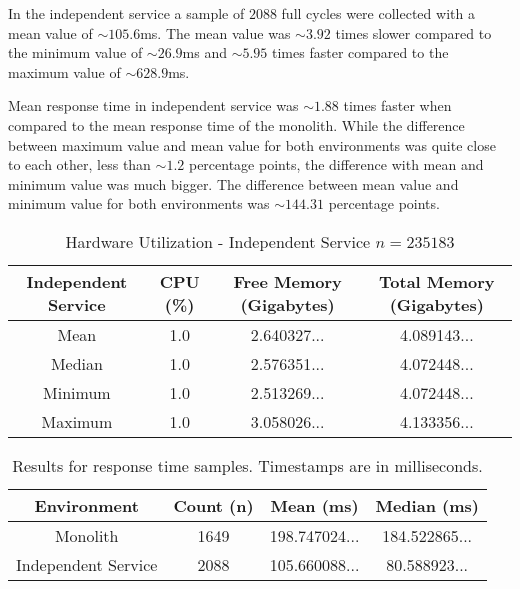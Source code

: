 In the independent service a sample of $2088$ full cycles were collected with a mean value of $\sim105.6$ms.
The mean value was $\sim3.92$ times slower compared to the minimum value of $\sim 26.9$ms and $\sim5.95$ times faster compared to the maximum value of $\sim 628.9$ms.

Mean response time in independent service was $\sim1.88$ times faster when compared to the mean response time of the monolith.
While the difference between maximum value and mean value for both environments was quite close to each other, less than $\sim1.2$ percentage points, the difference with mean and minimum value was much bigger.
The difference between mean value and minimum value for both environments was $\sim144.31$ percentage points.

\begin{table}[h!]
       \begin{tabular}{|c|c|c|c|} 
        \hline
        Independent Service
        & CPU (\%)
        & Free Memory (Gigabytes)
        & Total Memory (Gigabytes) \\ [0.5ex] 
        
        \hline\hline
        Mean
        & 1.0
        & 2.640327...
        & 4.089143... \\ 
        
        Median
        & 1.0
        & 2.576351...
        & 4.072448... \\ 

        Minimum
        & 1.0
        & 2.513269...
        & 4.072448...\\ 
        
        Maximum
        & 1.0
        & 3.058026...
        & 4.133356... \\
        \hline
    \end{tabular}
    \caption{Hardware Utilization - Independent Service $n=235183$}
    \label{table:hardware results:independent service:1}
\end{table}

\begin{table}[h!]
    \begin{tabular}{|c|c|c|c|} 
        \hline
        Environment
        & Count (n)
        & Mean (ms)
        & Median (ms) \\ [0.5ex] 
        
        \hline\hline
        Monolith
        & 1649
        & 198.747024...
        & 184.522865...\\ 
        
        Independent Service
        & 2088
        & 105.660088...
        & 80.588923... \\
        \hline
    \end{tabular}
    \caption{Results for response time samples. Timestamps are in milliseconds.}
    \label{table:response time results:1}
\end{table}

